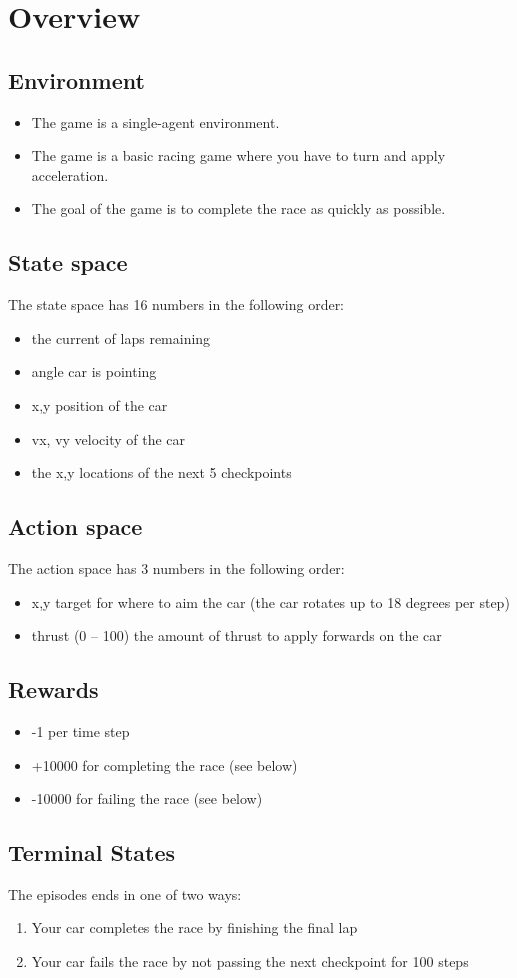 \documentclass[11pt]{article}
\author{Kevin James}
\date{\today}
\title{}
\begin{document}
\section{Overview}
\label{sec:org1a86ace}
\subsection{Environment}
\label{sec:org06a8bbb}
\begin{itemize}
\item The game is a single-agent environment.
\item The game is a basic racing game where you have to turn and apply acceleration.
\item The goal of the game is to complete the race as quickly as possible.
\end{itemize}
\subsection{State space}
\label{sec:orgb33e284}
The state space has 16 numbers in the following order:
\begin{itemize}
\item the current of laps remaining
\item angle car is pointing
\item x,y position of the car
\item vx, vy velocity of the car
\item the x,y locations of the next 5 checkpoints
\end{itemize}
\subsection{Action space}
\label{sec:orgd5d0bea}
The action space has 3 numbers in the following order:
\begin{itemize}
\item x,y target for where to aim the car (the car rotates up to 18 degrees per step)
\item thrust (0 -- 100) the amount of thrust to apply forwards on the car
\end{itemize}
\subsection{Rewards}
\label{sec:org2e8bdaa}
\begin{itemize}
\item -1 per time step
\item +10000 for completing the race (see below)
\item -10000 for failing the race (see below)
\end{itemize}
\subsection{Terminal States}
\label{sec:orge65f9d5}
The episodes ends in one of two ways:
\begin{enumerate}
\item Your car completes the race by finishing the final lap
\item Your car fails the race by not passing the next checkpoint for 100 steps
\end{enumerate}
\end{document}
